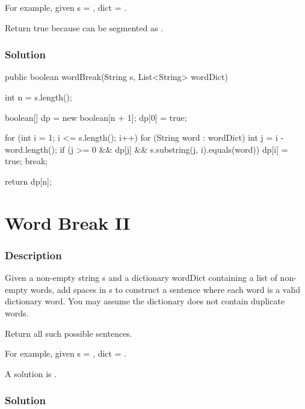 For example, given
s = ,
dict = .

Return true because  can be segmented as .

\subsubsection{Solution}

\begin{Code}
public boolean wordBreak(String s, List<String> wordDict) {
    int n = s.length();

    boolean[] dp = new boolean[n + 1];
    dp[0] = true;

    for (int i = 1; i <= s.length(); i++) {
        for (String word : wordDict) {
            int j = i - word.length();
            if (j >= 0 && dp[j] && s.substring(j, i).equals(word)) {
                dp[i] = true;
                break;
            }
        }
    }

    return dp[n];
}
\end{Code}

\newpage

\section{Word Break II}

\subsubsection{Description}
Given a non-empty string s and a dictionary wordDict containing a list of non-empty words, add spaces in s to construct a sentence where each word is a valid dictionary word. You may assume the dictionary does not contain duplicate words.

Return all such possible sentences.

For example, given
s = ,
dict = .

A solution is .

\subsubsection{Solution}

